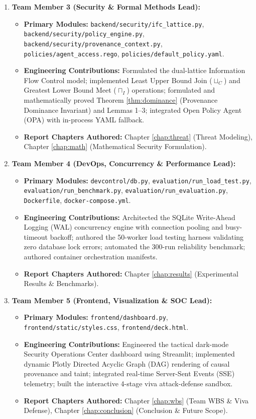 \begin{enumerate}
    \item \textbf{Team Member 3 (Security \& Formal Methods Lead):}
    \begin{itemize}
        \item \textbf{Primary Modules:} \texttt{backend/security/ifc\_lattice.py}, \texttt{backend/security/policy\_engine.py}, \texttt{backend/security/provenance\_context.py}, \texttt{policies/agent\_access.rego}, \texttt{policies/default\_policy.yaml}.
        \item \textbf{Engineering Contributions:} Formulated the dual-lattice Information Flow Control model; implemented Least Upper Bound Join ($\sqcup_C$) and Greatest Lower Bound Meet ($\sqcap_I$) operations; formulated and mathematically proved Theorem \ref{thm:dominance} (Provenance Dominance Invariant) and Lemmas 1--3; integrated Open Policy Agent (OPA) with in-process YAML fallback.
        \item \textbf{Report Chapters Authored:} Chapter \ref{chap:threat} (Threat Modeling), Chapter \ref{chap:math} (Mathematical Security Formulation).
    \end{itemize}

    \item \textbf{Team Member 4 (DevOps, Concurrency \& Performance Lead):}
    \begin{itemize}
        \item \textbf{Primary Modules:} \texttt{devcontrol/db.py}, \texttt{evaluation/run\_load\_test.py}, \texttt{evaluation/run\_benchmark.py}, \texttt{evaluation/run\_evaluation.py}, \texttt{Dockerfile}, \texttt{docker-compose.yml}.
        \item \textbf{Engineering Contributions:} Architected the SQLite Write-Ahead Logging (WAL) concurrency engine with connection pooling and busy-timeout backoff; authored the 50-worker load testing harness validating zero database lock errors; automated the 300-run reliability benchmark; authored container orchestration manifests.
        \item \textbf{Report Chapters Authored:} Chapter \ref{chap:results} (Experimental Results \& Benchmarks).
    \end{itemize}

    \item \textbf{Team Member 5 (Frontend, Visualization \& SOC Lead):}
    \begin{itemize}
        \item \textbf{Primary Modules:} \texttt{frontend/dashboard.py}, \texttt{frontend/static/styles.css}, \texttt{frontend/deck.html}.
        \item \textbf{Engineering Contributions:} Engineered the tactical dark-mode Security Operations Center dashboard using Streamlit; implemented dynamic Plotly Directed Acyclic Graph (DAG) rendering of causal provenance and taint; integrated real-time Server-Sent Events (SSE) telemetry; built the interactive 4-stage viva attack-defense sandbox.
        \item \textbf{Report Chapters Authored:} Chapter \ref{chap:wbs} (Team WBS \& Viva Defense), Chapter \ref{chap:conclusion} (Conclusion \& Future Scope).
    \end{itemize}
\end{enumerate}

